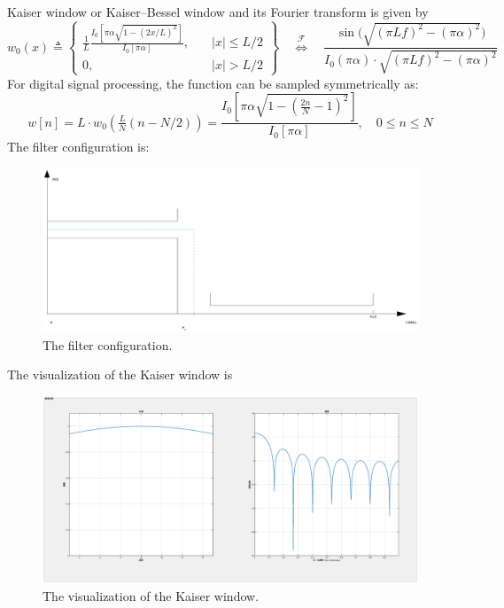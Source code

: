 \documentclass[a4paper,12pt,twoside]{article}
\begin{document}
Kaiser window or Kaiser–Bessel window and its Fourier transform is given by
\begin{equation}
w_0(x) \triangleq \left\{
\begin{array}{ccl}
\tfrac{1}{L}\frac{I_0\left[\pi\alpha \sqrt{1 - \left(2x/L\right)^2}\right]}{I_0[\pi\alpha]},\quad &\left|x\right| \leq L/2\\
0,\quad &\left|x\right| > L/2
\end{array}\right\}
\quad \stackrel{\mathcal{F}}{\Longleftrightarrow}\quad
\frac{\sin\bigg(\sqrt{(\pi L f)^2-(\pi \alpha)^2}\bigg)}
{I_0(\pi \alpha)\cdot \sqrt{(\pi L f)^2-(\pi \alpha)^2}}
\end{equation}
For digital signal processing, the function can be sampled symmetrically as:
\begin{equation}
    w[n] = L\cdot w_0\left(\tfrac{L}{N} (n-N/2)\right) = \frac{I_0\left[\pi\alpha \sqrt{1 - \left(\frac{2n}{N}-1\right)^2}\right]}{I_0[\pi\alpha]},\quad 0 \leq n \leq N
\end{equation}
The filter configuration is:
\begin{figure}[H]
    \centering
    \includegraphics[width=\textwidth]{images/full_view_analysis.eps}
    \caption{The filter configuration.}
\end{figure}
The visualization of the Kaiser window is
\begin{figure}[H]
    \centering
    \includegraphics[width=\textwidth]{images/window_visualization_tool.eps}
    \caption{The visualization of the Kaiser window.}
\end{figure}
\end{document}
